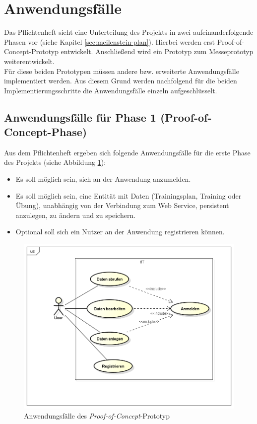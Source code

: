 \section{Anwendungsfälle}
\label{sec:anwendungsfaelle}
Das Pflichtenheft sieht eine Unterteilung des Projekts in zwei aufeinanderfolgende Phasen vor (siehe Kapitel \ref{sec:meilenstein-plan}). Hierbei werden erst Proof-of-Concept-Prototyp entwickelt. Anschließend wird ein Prototyp zum Messeprototyp weiterentwickelt. \\
Für diese beiden Prototypen müssen andere bzw. erweiterte Anwendungsfälle implementiert werden. Aus diesem Grund werden nachfolgend für die beiden Implementierungsschritte die Anwendungsfälle einzeln aufgeschlüsselt. 
\subsection{Anwendungsfälle für Phase 1 (Proof-of-Concept-Phase)}
\label{ssec:anwendungsfaelle-poc}
Aus dem Pflichtenheft ergeben sich folgende Anwendungsfälle für die erste Phase des Projekts (siehe Abbildung \ref{pic:usecase-poc}):
\begin{itemize}
\item Es soll möglich sein, sich an der Anwendung anzumelden.
\item Es soll möglich sein, eine Entität mit Daten (Trainingsplan, Training oder Übung), unabhängig von der Verbindung zum Web Service, persistent anzulegen, zu ändern und zu speichern.
\item Optional soll sich ein Nutzer an der Anwendung registrieren können.
\end{itemize}

\begin{figure}[h]
\centering
\includegraphics[width=0.8\linewidth]{content/images/UseCase-Proof-of-Concept.png}
\caption{Anwendungsfälle des \textit{Proof-of-Concept}-Prototyp}
\label{pic:usecase-poc}
\end{figure}

